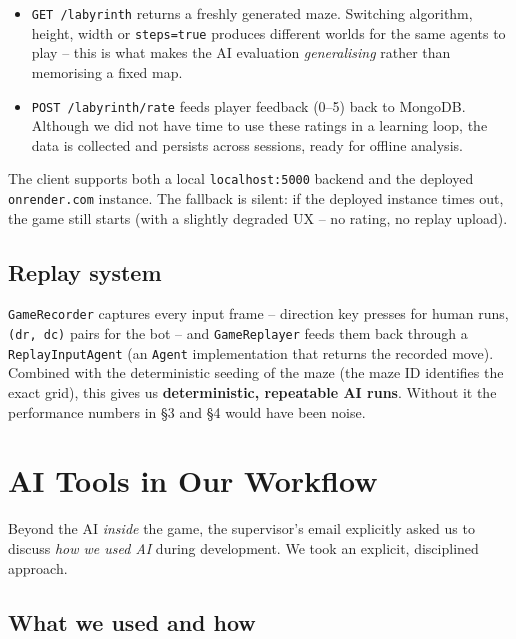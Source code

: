 \documentclass[11pt,a4paper]{article}
\begin{document}
\begin{itemize}[leftmargin=1.3em,itemsep=1pt]
  \item \texttt{GET /labyrinth} returns a freshly generated maze.
        Switching algorithm, height, width or \texttt{steps=true}
        produces different worlds for the same agents to play -- this
        is what makes the AI evaluation \emph{generalising} rather than
        memorising a fixed map.
  \item \texttt{POST /labyrinth/rate} feeds player feedback (0--5) back
        to MongoDB. Although we did not have time to use these ratings
        in a learning loop, the data is collected and persists across
        sessions, ready for offline analysis.
\end{itemize}

The client supports both a local \texttt{localhost:5000} backend and
the deployed \texttt{onrender.com} instance. The fallback is silent: if
the deployed instance times out, the game still starts (with a slightly
degraded UX -- no rating, no replay upload).

\subsection{Replay system}

\texttt{GameRecorder} captures every input frame -- direction key
presses for human runs, \texttt{(dr, dc)} pairs for the bot --
and \texttt{GameReplayer} feeds them back through a
\texttt{ReplayInputAgent} (an \texttt{Agent} implementation that
returns the recorded move). Combined with the deterministic seeding of
the maze (the maze ID identifies the exact grid), this gives us
\textbf{deterministic, repeatable AI runs}. Without it the
performance numbers in \S3 and \S4 would have been noise.

\section{AI Tools in Our Workflow}

Beyond the AI \emph{inside} the game, the supervisor's email explicitly
asked us to discuss \emph{how we used AI} during development. We took an
explicit, disciplined approach.

\subsection{What we used and how}
\end{document}
